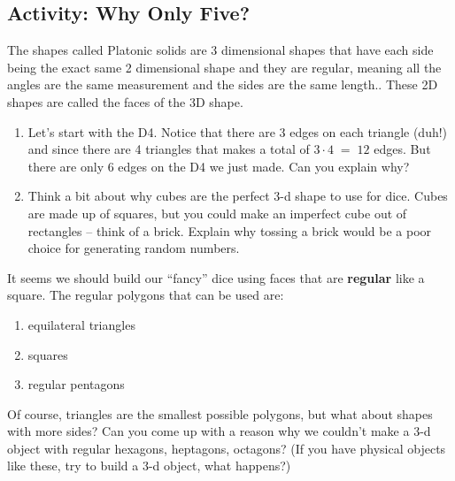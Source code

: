 \subsection{Activity: Why Only Five?}
The shapes called Platonic solids are 3 dimensional shapes that have each side being the exact same 2 dimensional shape and they are regular, meaning all the angles are the same measurement and the sides are the same length.. These 2D shapes are called the faces of the 3D shape.
\begin{enumerate}

\item Let's start with the D4. Notice that there are 3 edges on each triangle (duh!) and since there are 4 triangles that makes a total of $3 \cdot 4 \; = \; 12$ edges.  But there are only 6 edges on the D4 we just made.  Can you explain why?



\wbvfill



\item Think a bit about why cubes are the perfect 3-d shape to use for dice.  Cubes are made up of squares, but you could make an imperfect cube out of rectangles -- think of a brick.  Explain why tossing a brick would be a poor choice for generating random numbers.
\end{enumerate}
\wbvfill

\wbnewpage
It seems we should build our ``fancy'' dice using faces that are {\bf regular} like a square.  The regular polygons that can be used are:

\begin{enumerate}
    \item equilateral triangles
    \item squares
    \item regular pentagons
\end{enumerate}

Of course, triangles are the smallest possible polygons, but what about shapes with more sides?  Can you come up with a reason why we couldn't make a 3-d object with regular hexagons, heptagons, octagons? (If you have physical objects like these, try to build a 3-d object, what happens?)

